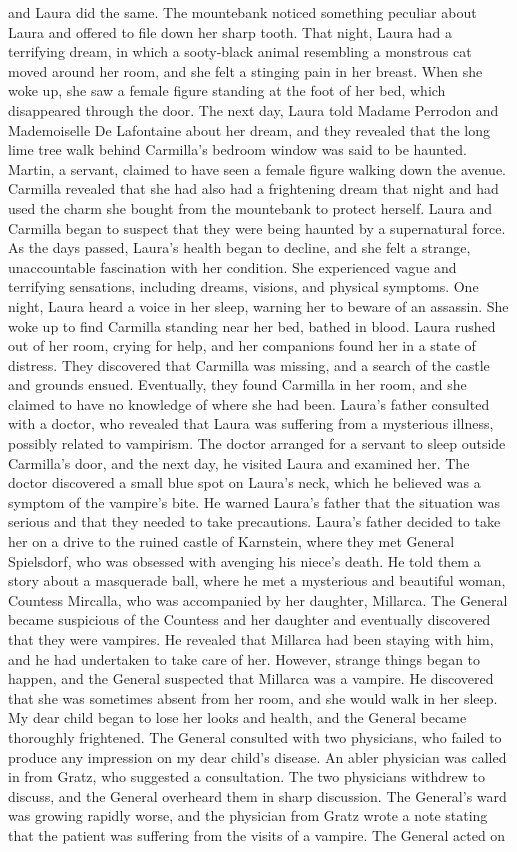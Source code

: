 \documentclass{article} %
\begin{document}
and Laura did the same. The mountebank noticed something peculiar about Laura and offered to file down her sharp tooth. That night, Laura had a terrifying dream, in which a sooty-black animal resembling a monstrous cat moved around her room, and she felt a stinging pain in her breast. When she woke up, she saw a female figure standing at the foot of her bed, which disappeared through the door. The next day, Laura told Madame Perrodon and Mademoiselle De Lafontaine about her dream, and they revealed that the long lime tree walk behind Carmilla's bedroom window was said to be haunted. Martin, a servant, claimed to have seen a female figure walking down the avenue. Carmilla revealed that she had also had a frightening dream that night and had used the charm she bought from the mountebank to protect herself. Laura and Carmilla began to suspect that they were being haunted by a supernatural force. As the days passed, Laura's health began to decline, and she felt a strange, unaccountable fascination with her condition. She experienced vague and terrifying sensations, including dreams, visions, and physical symptoms. One night, Laura heard a voice in her sleep, warning her to beware of an assassin. She woke up to find Carmilla standing near her bed, bathed in blood. Laura rushed out of her room, crying for help, and her companions found her in a state of distress. They discovered that Carmilla was missing, and a search of the castle and grounds ensued. Eventually, they found Carmilla in her room, and she claimed to have no knowledge of where she had been. Laura's father consulted with a doctor, who revealed that Laura was suffering from a mysterious illness, possibly related to vampirism. The doctor arranged for a servant to sleep outside Carmilla's door, and the next day, he visited Laura and examined her. The doctor discovered a small blue spot on Laura's neck, which he believed was a symptom of the vampire's bite. \textcolor{skipred}{He warned Laura's father that the situation was serious and that they needed to take precautions.} Laura's father decided to take her on a drive to the ruined castle of Karnstein, where they met General Spielsdorf, who was obsessed with avenging his niece's death. He told them a story about a masquerade ball, where he met a mysterious and beautiful woman, Countess Mircalla, who was accompanied by her daughter, Millarca. The General became suspicious of the Countess and her daughter and eventually discovered that they were vampires. He revealed that Millarca had been staying with him, and he had undertaken to take care of her. However, strange things began to happen, and the General suspected that Millarca was a vampire. He discovered that she was sometimes absent from her room, and she would walk in her sleep. My dear child began to lose her looks and health, and the General became thoroughly frightened. The General consulted with two physicians, who failed to produce any impression on my dear child's disease. An abler physician was called in from Gratz, who suggested a consultation. The two physicians withdrew to discuss, and the General overheard them in sharp discussion. The General's ward was growing rapidly worse, and the physician from Gratz wrote a note stating that the patient was suffering from the visits of a vampire. The General acted on 
\end{document}
